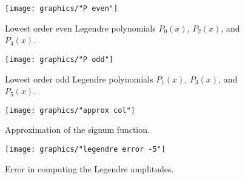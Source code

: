 \begin{figure}[htbp] %
   \centering
   \texttt{[image: graphics/"P even"]} 
   \caption{Lowest order even Legendre polynomials $P_{0}(x)$, $P_{2}(x)$, and $P_{4}(x)$.}
   \label{fig:P even}
\end{figure}

\begin{figure}[htbp] %
   \centering
   \texttt{[image: graphics/"P odd"]} 
   \caption{Lowest order odd Legendre polynomials $P_{1}(x)$, $P_{3}(x)$, and $P_{5}(x)$.}
   \label{fig:P odd}
\end{figure}

\begin{figure}[htbp] %
   \centering
   \texttt{[image: graphics/"approx col"]} 
   \caption{Approximation of the signum function.}
   \label{fig:signum approx}
\end{figure}

\begin{figure}[htbp] %
   \centering
   \texttt{[image: graphics/"legendre error -5"]} 
   \caption{Error in computing the Legendre amplitudes.}
   \label{fig:legendre error}
\end{figure}

\endinput %